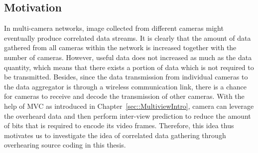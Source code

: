 \subsection{Motivation}
In multi-camera networks, image collected from different cameras might eventually produce correlated data streams.
It is clearly that the amount of data gathered from all cameras within the network is increased together with the number of cameras.
However, useful data does not increased as much as the data quantity, which means that there exists a portion of data which is not required to be transmitted.
Besides, since the data transmission from individual cameras to the data aggregator is through a wireless communication link, there is a chance for cameras to receive and decode the transmission of other cameras.
With the help of MVC as introduced in Chapter~\ref{sec::MultiviewIntro}, camera can leverage the overheard data and then perform inter-view prediction to reduce the amount of bits that is required to encode its video frames.
Therefore, this idea thus motivates us to investigate the idea of correlated data gathering through overhearing source coding in this thesis.
%
